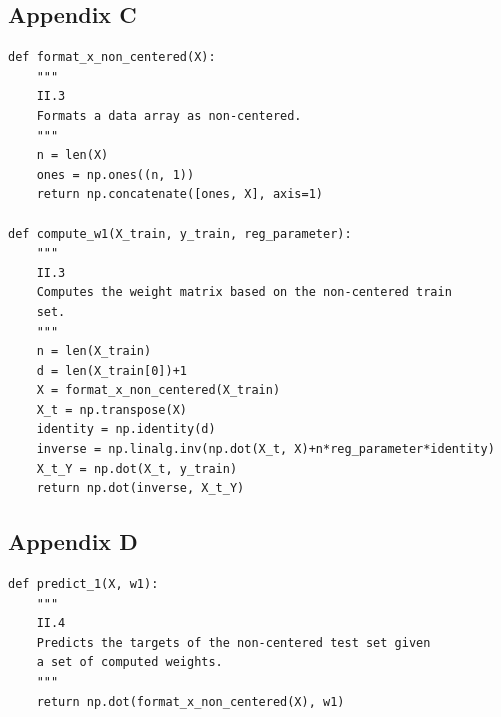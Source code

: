 \documentclass{homework}
\begin{document}
\subsection*{Appendix C}
\lstset{language=Python}
\lstset{frame=lines}
\lstset{basicstyle=\footnotesize}
\begin{lstlisting}
def format_x_non_centered(X):
    """
    II.3
    Formats a data array as non-centered.
    """
    n = len(X)
    ones = np.ones((n, 1))
    return np.concatenate([ones, X], axis=1)

def compute_w1(X_train, y_train, reg_parameter):
    """
    II.3
    Computes the weight matrix based on the non-centered train
    set.
    """
    n = len(X_train)
    d = len(X_train[0])+1
    X = format_x_non_centered(X_train)
    X_t = np.transpose(X)
    identity = np.identity(d)
    inverse = np.linalg.inv(np.dot(X_t, X)+n*reg_parameter*identity)
    X_t_Y = np.dot(X_t, y_train)
    return np.dot(inverse, X_t_Y)
\end{lstlisting}

\subsection*{Appendix D}
\lstset{language=Python}
\lstset{frame=lines}
\lstset{basicstyle=\footnotesize}
\begin{lstlisting}
def predict_1(X, w1):
    """
    II.4
    Predicts the targets of the non-centered test set given 
    a set of computed weights.
    """
    return np.dot(format_x_non_centered(X), w1)
\end{lstlisting}
\end{document}
